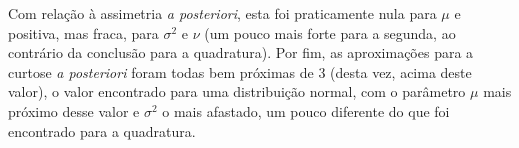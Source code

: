 Com relação à assimetria \textit{a posteriori}, esta foi praticamente nula para $\mu$ e positiva, mas fraca, para $\sigma^2$ e $\nu$ (um pouco mais forte para a segunda, ao contrário da conclusão para a quadratura). Por fim, as aproximações para a curtose \textit{a posteriori} foram todas bem próximas de 3 (desta vez, acima deste valor), o valor encontrado para uma distribuição normal, com o parâmetro $\mu$ mais próximo desse valor e $\sigma^2$ o mais afastado, um pouco diferente do que foi encontrado para a quadratura.